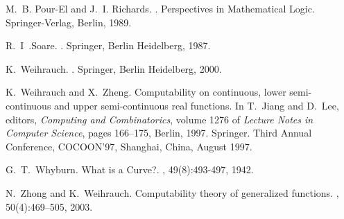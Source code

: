 \documentclass{LMCS}
\theoremstyle{plain}
\begin{document}
\begin{thebibliography}{10}
M.~B. Pour-El and J.~I. Richards.
.
\newblock Perspectives in Mathematical Logic. Springer-Verlag, Berlin, 1989.

R.~I~.Soare.
.
\newblock Springer, Berlin Heidelberg, 1987.

K.~Weihrauch.
.
\newblock Springer, Berlin Heidelberg, 2000.

K.~Weihrauch and X.~Zheng.
\newblock Computability on continuous, lower semi-continuous and upper
  semi-continuous real functions.
\newblock In T.~Jiang and D.~Lee, editors, {\em Computing and Combinatorics},
  volume 1276 of {\em Lecture Notes in Computer Science}, pages 166--175,
  Berlin, 1997. Springer.
\newblock Third Annual Conference, COCOON'97, Shanghai, China, August 1997.

G.~T.~Whyburn.
\newblock What is a Curve?.
, 49(8):493-497, 1942.

N.~Zhong and K.~Weihrauch.
\newblock Computability theory of generalized functions.
, 50(4):469--505, 2003.

\end{thebibliography}
\end{document}
